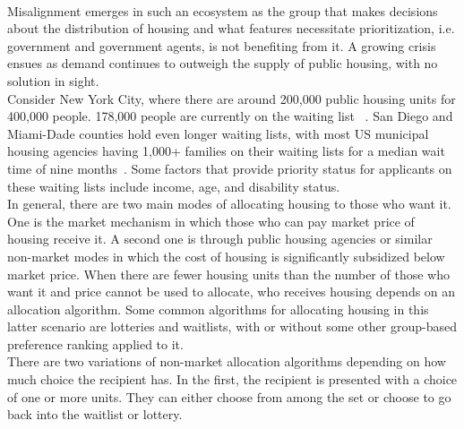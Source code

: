 \documentclass[11pt]{article}
\begin{document}
\\ Misalignment emerges in such an ecosystem as the group that makes decisions about the distribution of housing and what features necessitate prioritization, i.e. government and government agents, is not benefiting from it. A growing crisis ensues as demand continues to outweigh the supply of public housing, with no solution in sight. \\
\newline
Consider New York City, where there are around 200,000 public housing units for 400,000 people. 178,000 people are currently on the waiting list ~\cite{sonya_acosta_long_2021}. San Diego and Miami-Dade counties hold even longer waiting lists, with most US municipal housing agencies having 1,000+ families on their waiting lists for a median wait time of nine months~\cite{nlihc_out_2019}. Some factors that provide priority status for applicants on these waiting lists include income, age, and disability status. \\
\newline
In general, there are two main modes of allocating housing to those who want it. One is the market mechanism in which those who can pay market price of housing receive it. A second one is through public housing agencies or similar non-market modes in which the cost of housing is significantly subsidized below market price. When there are fewer housing units than the number of those who want it and price cannot be used to allocate, who receives housing depends on an allocation algorithm. Some common algorithms for allocating housing in this latter scenario are lotteries and waitlists, with or without some other group-based preference ranking applied to it.\\
 \newline
There are two variations of non-market allocation algorithms depending on how much choice the recipient has. In the first, the recipient is presented with a choice of one or more units. They can either choose from among the set or choose to go back into the waitlist or lottery. 
\end{document}
